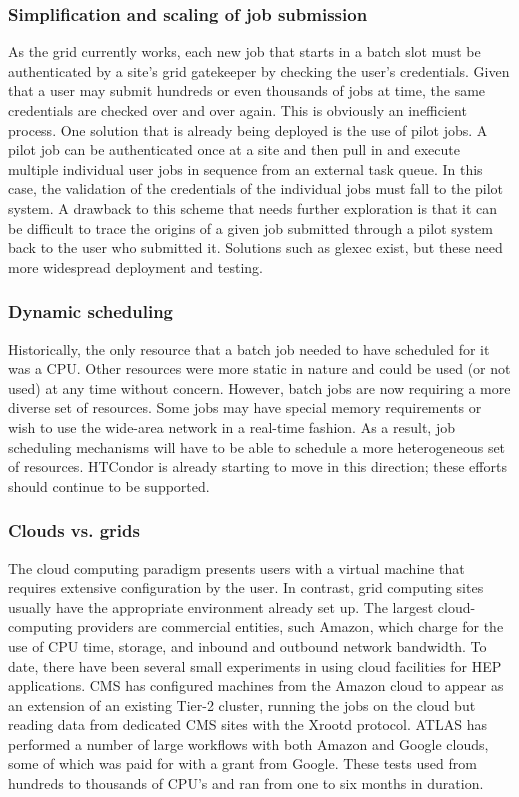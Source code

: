 \subsubsection{Simplification and scaling of job submission}

As the grid currently works, each new job that starts in a batch slot must be authenticated by a site's grid gatekeeper by checking the user's credentials.  Given that a user may submit hundreds or even thousands of jobs at time, the same credentials are checked over and over again.  This is obviously an inefficient process.  One solution that is already being deployed is the use of pilot jobs.  A pilot job can be authenticated once at a site and then pull in and execute multiple individual user jobs in sequence from an external task queue.  In this case, the validation of the credentials of the individual jobs must fall to the pilot system.  A drawback to this scheme that needs further exploration is that it can be difficult to trace the origins of a given job submitted through a pilot system back to the user who submitted it.  Solutions such as glexec exist, but these need more widespread deployment and testing.

\subsubsection{Dynamic scheduling}

Historically, the only resource that a batch job needed to have scheduled for it was a CPU.  Other resources were more static in nature and could be used (or not used) at any time without concern.  However, batch jobs are now requiring a more diverse set of resources.  Some jobs may have special memory requirements or wish to use the wide-area network in a real-time fashion.  As a result, job scheduling mechanisms will have to be able to schedule a more heterogeneous set of resources.  HTCondor is already starting to move in this direction; these efforts should continue to be supported.

\subsubsection{Clouds vs. grids}

The cloud computing paradigm presents users with a virtual machine that requires extensive configuration by the user.  In contrast, grid computing sites usually have the appropriate environment already set up.  The largest cloud-computing providers are commercial entities, such Amazon, which charge for the use of CPU time, storage, and inbound and outbound network bandwidth.  To date, there have been several small experiments in using cloud facilities for HEP applications.  CMS has configured machines from the Amazon cloud to appear as an extension of an existing Tier-2 cluster, running the jobs on the cloud but reading data from dedicated CMS sites with the Xrootd protocol.  ATLAS has performed a number of large workflows with both Amazon and Google clouds, some of which was paid for with a grant from Google.  These tests used from hundreds to thousands of CPU’s and ran from one to six months in duration.

